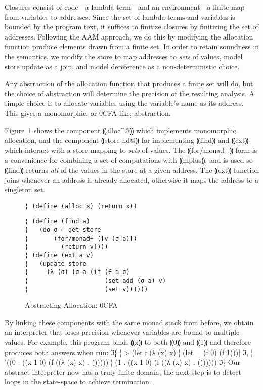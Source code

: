Closures consist of code---a lambda term---and an environment---a finite map
from variables to addresses.  Since the set of lambda terms and variables is
bounded by the program text, it suffices to finitize closures by finitizing the
set of addresses.  Following the AAM approach, we do this by modifying the
allocation function produce elements drawn from a finite set.  In order to
retain soundness in the semantics, we modify the store to map addresses to
\emph{sets} of values, model store update as a join, and model dereference as a
non-deterministic choice.

Any abstraction of the allocation function that produces a finite set will do,
but the choice of abstraction will determine the precision of the resulting
analysis.  A simple choice is to allocate variables using the variable's name
as its address.  This gives a monomorphic, or 0CFA-like, abstraction.

Figure~\ref{f:0cfa-abs} shows the component ⸨alloc^@⸩ which implements
monomorphic allocation, and the component ⸨store-nd@⸩ for implementing ⸨find⸩
and ⸨ext⸩ which interact with a store mapping to \emph{sets} of values. The
⸨for/monad+⸩ form is a convenience for combining a set of computations with
⸨mplus⸩, and is used so ⸨find⸩ returns \emph{all} of the values in the store at
a given address.  The ⸨ext⸩ function joins whenever an address is already
allocated, otherwise it maps the address to a singleton set.

\begin{figure} %
\begin{lstlisting}
¦ (define (alloc x) (return x))
\end{lstlisting}
\figskip{}
\begin{lstlisting}
¦ (define (find a)
¦   (do σ ← get-store
¦       (for/monad+ ([v (σ a)])
¦         (return v))))
¦ (define (ext a v)
¦   (update-store
¦     (λ (σ) (σ a (if (∈ a σ) 
¦                     (set-add (σ a) v) 
¦                     (set v))))))
\end{lstlisting}
\caption{Abstracting Allocation: 0CFA}
\label{f:0cfa-abs}
\end{figure} %

By linking these components with the same monad stack from before, we obtain an
interpreter that loses precision whenever variables are bound to multiple
values.  For example, this program binds ⸨x⸩ to both ⸨0⸩ and ⸨1⸩ and therefore
produces both answers when run:
ℑ⁅
¦ > (let f (λ (x) x)
¦     (let _ (f 0) (f 1)))]
ℑ,
¦ '((0 . ((x 1 0) (f ((λ (x) x) . ()))))
¦   (1 . ((x 1 0) (f ((λ (x) x) . ())))))
ℑ⁆
Our abstract interpreter now has a truly finite domain; the next step is to
detect loops in the state-space to achieve termination.
